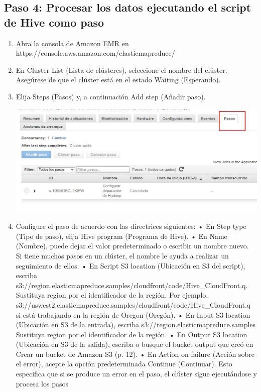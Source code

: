 \documentclass[12pt,letterpaper]{article}
\begin{document}
\begin{enumerate}
\begin{enumerate}
\end{enumerate}	
	\subsection{Paso 4: Procesar los datos ejecutando el script de Hive como paso
}
\begin{enumerate}
	\item	 Abra la consola de Amazon EMR en https://console.aws.amazon.com/elasticmapreduce/
	\item En Cluster List (Lista de clústeres), seleccione el nombre del clúster. Asegúrese de que el clúster está en
	el estado Waiting (Esperando). 
	\item	 Elija Steps (Pasos) y, a continuación Add step (Añadir paso). 
	\begin{center}
		\includegraphics[width=14cm]{./img/4.3.jpg} 
	\end{center}
	\item  Configure el paso de acuerdo con las directrices siguientes:
	• En Step type (Tipo de paso), elija Hive program (Programa de Hive).
	• En Name (Nombre), puede dejar el valor predeterminado o escribir un nombre nuevo. Si tiene
	muchos pasos en un clúster, el nombre le ayuda a realizar un seguimiento de ellos.
	• En Script S3 location (Ubicación en S3 del script), escriba
	s3://region.elasticmapreduce.samples/cloudfront/code/Hive_CloudFront.q. Sustituya region por el
	identificador de la región. Por ejemplo, s3://uswest2.elasticmapreduce.samples/cloudfront/code/Hive_CloudFront.q si está trabajando en la región de
	Oregon (Oregón).
	• En Input S3 location (Ubicación en S3 de la entrada), escriba s3://region.elasticmapreduce.samples
	Sustituya region por el identificador de la región.
	• En Output S3 location (Ubicación en S3 de la salida), escriba o busque el bucket output que creó en
	Crear un bucket de Amazon S3 (p. 12).
	• En Action on failure (Acción sobre el error), acepte la opción predeterminada Continue (Continuar).
	Esto especifica que si se produce un error en el paso, el clúster sigue ejecutándose y procesa los pasos

\end{enumerate}
\end{enumerate}
\end{document}
